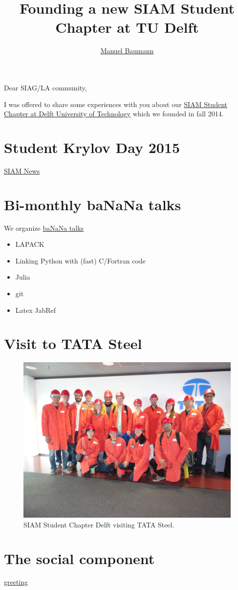\documentclass{article}
\title{\bf Founding a new SIAM Student Chapter at TU Delft}
\author{\href{http://www.manuelbaumann.de}{Manuel Baumann}}
\begin{document}
 
 \maketitle
 
 
 Dear SIAG/LA community,
 
 \noindent I was offered to share some experiences with you about our \href{http://sscdelft.github.io/}{SIAM Student Chapter at Delft University of Technology} which we founded in fall 2014.
 \section*{Student Krylov Day 2015}
 \href{https://sinews.siam.org/DetailsPage/tabid/607/ArticleID/504/European-Students-Gather-at-TU-Delft-for-Krylov-Day.aspx}{SIAM News}
 \section*{Bi-monthly ba\color{red}NaN\color{black}a talks}
 We organize \href{http://projectbanana.github.io/}{ba\color{red}NaN\color{black}a talks}
  \begin{itemize}
  \item LAPACK
  \item Linking Python with (fast) C/Fortran code
  \item Julia
  \item git
  \item Latex JabRef
 \end{itemize}
 \section*{Visit to TATA Steel}

 \begin{figure}[ht]
 \centering
  \includegraphics[width=\textwidth]{DSC02054.jpg}
  \caption{SIAM Student Chapter Delft visiting TATA Steel.}
 \end{figure}

 \section*{The social component}
 
 
 \href{https://www.youtube.com/watch?v=D9dobJG-ttw}{greeting}
 
\end{document}
